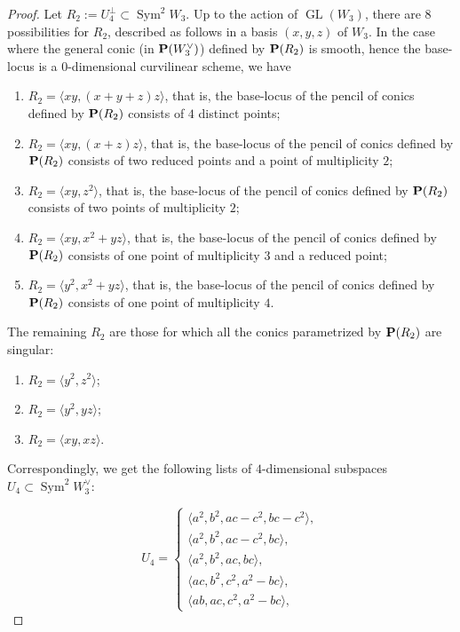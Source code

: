 \documentclass[11pt]{article}
\newenvironment{enumeratea}
{\bgroup\def\theenumi{\alph{enumi}}\def\theenumii{\arabic{enumii}}\begin{enumerate}}
{\end{enumerate}\egroup}
\theoremstyle{definition}
\let\la\langle
\let\ra\rangle
\DeclareMathOperator{\GL}{GL}
\DeclareMathOperator{\Sym}{Sym}
\begin{document}
\begin{proof}
Let $R_2:=U_4^{\bot}\subset \Sym^2 \!W_3$. Up to the action of $\GL(W_3)$, there are $8$ possibilities for $R_2$, described as follows in a basis $(x,y,z)$ of $W_3$. In the case where the general conic (in $\PP(W^{\vee}_3)$) defined by $\PP(R_2)$ is smooth, hence the base-locus is a $0$-dimensional curvilinear scheme, we have
\begin{enumerate}
\item
$R_2=\la xy,(x+y+z)z\ra$, that is, the base-locus of the pencil of conics defined by $\PP(R_2)$ consists of $4$ distinct points;
\item
$R_2=\la xy,(x+z)z\ra$, that is, the base-locus of the pencil of conics defined by $\PP(R_2)$ consists of two reduced points and a point of multiplicity $2$;
\item
$R_2=\la xy,z^2\ra$, that is, the base-locus of the pencil of conics defined by $\PP(R_2)$ consists of two points of multiplicity $2$;
\item
$R_2=\la xy,x^2+yz\ra$, that is, the base-locus of the pencil of conics defined by $\PP(R_2)$ consists of one point of multiplicity $3$ and a reduced point;
\item
$R_2=\la y^2,x^2+yz\ra$, that is, the base-locus of the pencil of conics defined by $\PP(R_2)$ consists of one point of multiplicity $4$.
\end{enumerate}
The remaining $R_2$ are those for which all the conics parametrized by $\PP(R_2)$ are singular:
\begin{enumeratea}
\item
$R_2=\la y^2,z^2\ra$;
\item
$R_2=\la y^2,y z\ra$;
\item
$R_2=\la xy,xz\ra$.
\end{enumeratea}
\noindent
Correspondingly, we get the following lists of $4$-dimensional subspaces $U_4\subset \Sym^2 \!W^{\vee}_3$:
\par\noindent
\begin{minipage}[m]{.5\textwidth}
\begin{equation}\label{primocaso}
U_4=
\begin{cases}
\la a^2,b^2,ac-c^2,bc-c^2\ra, \\
\la a^2,b^2,ac-c^2,bc\ra, \\
\la a^2,b^2,ac,bc\ra, \\
\la ac,b^2,c^2,a^2-bc\ra, \\
\la ab,ac,c^2,a^2-bc\ra,
\end{cases}
\end{equation}

\end{minipage}
\end{proof}
\end{document}
